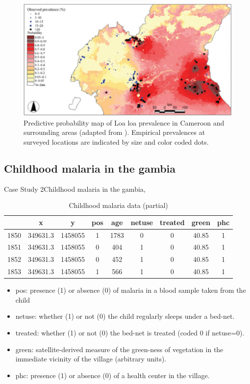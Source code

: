 \documentclass[11pt,compress,UTF8]{beamer}
\begin{document}
\begin{frame}
\begin{figure}
\centering
\includegraphics[width=.9\textwidth]{Loaloa}
\caption{Predictive probability map of Loa loa prevalence in Cameroon and surrounding areas (adapted from \citet{Diggle2007a} ). Empirical prevalences at surveyed locations are indicated by size and color coded dots.}
\end{figure}
\end{frame}



\subsection{Childhood malaria in the gambia}
\begin{frame}{Case Study 2}{Childhood malaria in the gambia, \citet{Diggle2002}}
\begin{table}
\footnotesize
\vspace{-1em}
\caption{\label{tab:gambia}Childhood malaria data (partial)}
\vspace{-1em}
\centering
\begin{tabular}[t]{l|c|c|c|c|c|c|c|c}
\hline
  & x & y & pos & age & netuse & treated & green & phc\\
\hline
1850 & 349631.3 & 1458055 & 1 & 1783 & 0 & 0 & 40.85 & 1\\
\hline
1851 & 349631.3 & 1458055 & 0 & 404 & 1 & 0 & 40.85 & 1\\
\hline
1852 & 349631.3 & 1458055 & 0 & 452 & 1 & 0 & 40.85 & 1\\
\hline
1853 & 349631.3 & 1458055 & 1 & 566 & 1 & 0 & 40.85 & 1\\
\hline
\end{tabular}
\end{table}
\begin{itemize}
\item pos: presence (1) or absence (0) of malaria in a blood sample taken from the child
\item netuse: whether (1) or not (0) the child regularly sleeps under a bed-net.
\item treated: whether (1) or not (0) the bed-net is treated (coded 0 if netuse=0).
\item green: satellite-derived measure of the green-ness of vegetation in the immediate vicinity of the village (arbitrary units).
\item phc: presence (1) or absence (0) of a health center in the village.
\end{itemize}
\end{frame}
\end{document}
